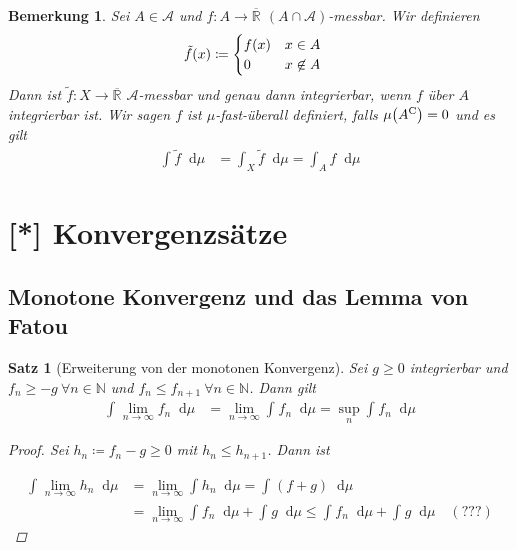 \documentclass[11pt, twoside, a4paper]{article}
\theoremstyle{plain}
\newtheorem{bemerkung}[blockelement]{Bemerkung}
\newtheorem{satz}[blockelement]{Satz}
\numberwithin{equation}{subsection}
\newcommand{\pair}[1]{\left(#1\right)}
\newcommand{\of}[1]{\mathopen{}\mathclose{}\bgroup\left(#1\aftergroup\egroup\right)}
\newcommand{\dif}{\mathop{}\!\mathrm{d}}
\newcommand{\toinf}{\to\infty}
\newcommand{\comp}[1]{{#1}^{\mathrm{C}}}
\newcommand{\R}{\mathbb{R}}
\newcommand{\N}{\mathbb{N}}
\newcommand{\mA}{\mathcal{A}}
\begin{document}
    \begin{bemerkung}
        Sei $A\in\mA$ und $f: A \to\overline{\R}$ $\pair{A \cap \mA}$-messbar. Wir definieren
        \begin{align*}
            \tilde{f}\of{x} &\coloneqq \begin{cases}
                                           f\of{x} &x\in A\\
                                           0 &x\not\in A
            \end{cases}
        \end{align*}
        Dann ist $\tilde{f}: X\to\overline{\R}$ $\mA$-messbar und genau dann integrierbar, wenn $f$ über $A$ integrierbar ist. Wir sagen $f$ ist $\mu$-fast-überall definiert, falls $\mu\of{\comp{A}} = 0$ und es gilt
        \begin{align*}
            \int_{}^{} \tilde{f} \dif \mu &= \int_{X}^{} \tilde{f} \dif \mu = \int_{A}^{} f \dif \mu
        \end{align*}
    \end{bemerkung}

    \newpage


    \section{[*] Konvergenzsätze}

    \subsection{Monotone Konvergenz und das Lemma von Fatou}
    \thispagestyle{pagenumberonly}

    \begin{satz}[Erweiterung von der monotonen Konvergenz]
        \label{satz:monton-konv}
        Sei $g\geq 0$ integrierbar und $f_n \geq -g~\forall n\in\N$ und $f_n \leq f_{n+1}~\forall n\in\N$. Dann gilt
        \begin{align*}
            \int_{}^{} \lim_{n\toinf} f_n \dif \mu &= \lim_{n\toinf} \int_{}^{} f_n \dif \mu = \sup_{n} \int_{}^{} f_n \dif \mu
        \end{align*}

        \begin{proof}
            Sei $h_n \coloneqq f_n - g \geq 0$ mit $h_n \leq h_{n+1}$. Dann ist

            \begin{align*}
                \int_{}^{} \lim_{n\toinf}  h_n\dif \mu &= \lim_{n\toinf} \int_{}^{} h_n \dif \mu = \int_{}^{} (f+g) \dif \mu\\
                &= \lim_{n\toinf} \int_{}^{} f_n \dif \mu + \int_{}^{} g \dif \mu \leq \int_{}^{} f_n \dif \mu + \int_{}^{} g \dif \mu\quad(???)
            \end{align*}
        \end{proof}
    \end{satz}
\end{document}
